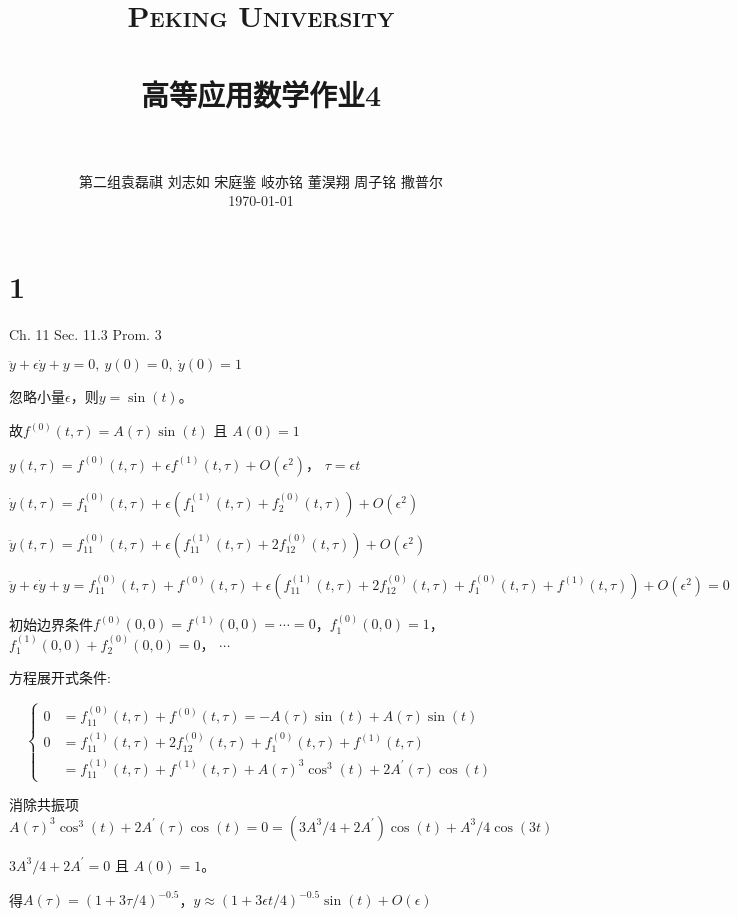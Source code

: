 \documentclass[12pt]{article}
\title{
		\vspace{-1in} 	
		\usefont{OT1}{bch}{b}{n}
		\normalfont \normalsize \textsc{\LARGE Peking University}\\[1cm] %
		\horrule{0.5pt} \\[0.5cm]
		\huge \bfseries{高等应用数学作业4} \\
		\horrule{2pt} \\[0.5cm]
}
\author{
		\normalfont 								\normalsize
		第二组\quad 袁磊祺 \quad 刘志如 \quad 宋庭鉴 \quad 岐亦铭 \quad 董淏翔 \quad 周子铭 \quad 撒普尔\\	\normalsize
        \today
}
\date{}
\begin{document}


\maketitle

\section{1}
Ch. 11 Sec. 11.3 Prom. 3

$\ddot{y} + \epsilon\dot{y} + y = 0,\ y(0)=0,\ \dot{y}(0)=1$

忽略小量$\epsilon$，则$y=\sin(t)$。

故$f^{(0)}(t,\tau) = A(\tau) \sin(t)$ 且 $A(0)=1$

$y(t,\tau) = f^{(0)}(t,\tau) + \epsilon f^{(1)}(t,\tau) + O(\epsilon^2)$， $\tau = \epsilon t$

$\dot{y}(t,\tau) = f^{(0)}_1(t,\tau) + \epsilon ( f^{(1)}_1(t,\tau) + f^{(0)}_2(t,\tau) ) +O(\epsilon^2)$

$\ddot{y}(t,\tau) = f^{(0)}_{11}(t,\tau) + \epsilon ( f^{(1)}_{11}(t,\tau) + 2f^{(0)}_{12}(t,\tau) ) + O(\epsilon^2)$

$\ddot{y} + \epsilon\dot{y} + y = f^{(0)}_{11}(t,\tau) + f^{(0)}(t,\tau) + \epsilon ( f^{(1)}_{11}(t,\tau) + 2f^{(0)}_{12}(t,\tau) + f^{(0)}_1(t,\tau) + f^{(1)}(t,\tau) )  + O(\epsilon^2) = 0 $

初始边界条件$f^{(0)}(0,0)=f^{(1)}(0,0)=\cdots=0$，$f^{(0)}_1(0,0)=1$，$f^{(1)}_1(0,0)+f^{(0)}_2(0,0)=0$， $\cdots$

方程展开式条件:

\begin{equation}
	\left\{
	\begin{array}{lll}
	0&=f^{(0)}_{11}(t,\tau) + f^{(0)}(t,\tau)=-A(\tau) \sin(t) + A(\tau) \sin(t)\\
	0&=f^{(1)}_{11}(t,\tau) + 2f^{(0)}_{12}(t,\tau) + f^{(0)}_1(t,\tau) + f^{(1)}(t,\tau)\\
	&=f^{(1)}_{11}(t,\tau) + f^{(1)}(t,\tau) + A(\tau)^3 \cos^3(t) + 2A^\prime(\tau) \cos(t)
	\end{array}
	\right.
\end{equation}


消除共振项$A(\tau)^3 \cos^3(t) + 2A^\prime(\tau) \cos(t) = 0 =(3A^3/4+2A^\prime)\cos(t) + A^3/4 \cos(3t)$

$3A^3/4+2A^\prime=0$ 且 $A(0)=1$。

得$A(\tau)=(1+3\tau/4)^{-0.5}$，$y \approx (1+3\epsilon t/4)^{-0.5} \sin(t) + O(\epsilon)$
\end{document}
